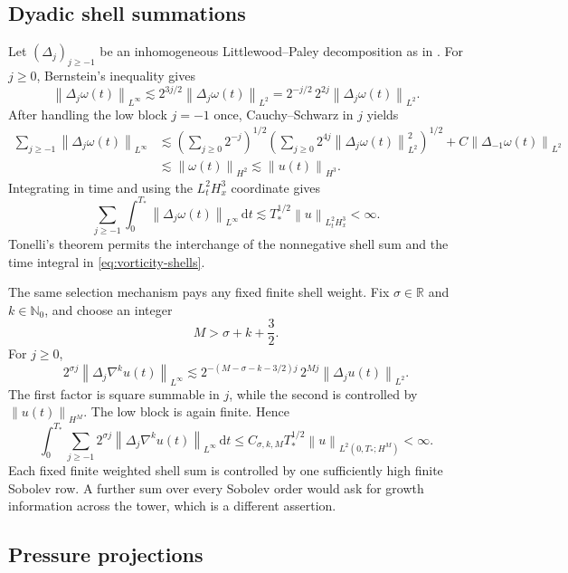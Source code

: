 \documentclass[11pt,letterpaper]{article}
\theoremstyle{definition}
\theoremstyle{remark}
\newcommand{\R}{\mathbb R}
\newcommand{\Nzero}{\mathbb N_0}
\newcommand{\norm}[1]{\left\lVert #1\right\rVert}
\newcommand{\dd}{\,\mathrm d}
\newcommand{\vort}{\omega}
\begin{document}
\subsection{Dyadic shell summations}

Let \((\Delta_j)_{j\ge-1}\) be an inhomogeneous Littlewood--Paley
decomposition as in \cite{BahouriCheminDanchin2011}.  For \(j\ge0\),
Bernstein's inequality gives
\[
\norm{\Delta_j\vort(t)}_{L^\infty}
\lesssim 2^{3j/2}\norm{\Delta_j\vort(t)}_{L^2}
=2^{-j/2}\,2^{2j}\norm{\Delta_j\vort(t)}_{L^2}.
\]
After handling the low block \(j=-1\) once, Cauchy--Schwarz in \(j\) yields
\begin{align*}
\sum_{j\ge-1}\norm{\Delta_j\vort(t)}_{L^\infty}
&\lesssim
\left(\sum_{j\ge0}2^{-j}\right)^{1/2}
\left(\sum_{j\ge0}2^{4j}
\norm{\Delta_j\vort(t)}_{L^2}^2\right)^{1/2}
+C\norm{\Delta_{-1}\vort(t)}_{L^2}\\
&\lesssim \norm{\vort(t)}_{H^2}
\lesssim \norm{u(t)}_{H^3}.
\end{align*}
Integrating in time and using the \(L_t^2H_x^3\) coordinate gives
\begin{equation}
\boxed{
\sum_{j\ge-1}\int_0^{T_*}
\norm{\Delta_j\vort(t)}_{L^\infty}\dd t
\lesssim T_*^{1/2}\norm{u}_{L_t^2H_x^3}<\infty.}
\label{eq:vorticity-shells}
\end{equation}
Tonelli's theorem permits the interchange of the nonnegative shell sum and
the time integral in \eqref{eq:vorticity-shells}.

The same selection mechanism pays any fixed finite shell weight.  Fix
\(\sigma\in\R\) and \(k\in\Nzero\), and choose an integer
\[
M>\sigma+k+\frac32.
\]
For \(j\ge0\),
\[
2^{\sigma j}\norm{\Delta_j\nabla^k u(t)}_{L^\infty}
\lesssim
2^{-(M-\sigma-k-3/2)j}
\,2^{Mj}\norm{\Delta_j u(t)}_{L^2}.
\]
The first factor is square summable in \(j\), while the second is controlled
by \(\norm{u(t)}_{H^M}\).  The low block is again finite.  Hence
\begin{equation}
\int_0^{T_*}\sum_{j\ge-1}2^{\sigma j}
\norm{\Delta_j\nabla^k u(t)}_{L^\infty}\dd t
\le C_{\sigma,k,M}T_*^{1/2}
\norm{u}_{L^2(0,T_*;H^M)}
<\infty.
\label{eq:weighted-shells}
\end{equation}
Each fixed finite weighted shell sum is controlled by one sufficiently high
finite Sobolev row.  A further sum over every Sobolev order would ask for
growth information across the tower, which is a different assertion.

\subsection{Pressure projections}
\end{document}
